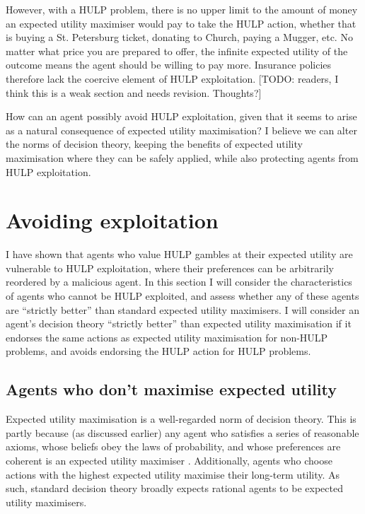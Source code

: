 \documentclass{article}
\begin{document}
However, with a HULP problem, there is no upper limit to the amount of money an expected utility maximiser would pay to take the HULP action, whether that is buying a St. Petersburg ticket, donating to Church, paying a Mugger, etc. No matter what price you are prepared to offer, the infinite expected utility of the outcome means the agent should be willing to pay more. Insurance policies therefore lack the coercive element of HULP exploitation. [TODO: readers, I think this is a weak section and needs revision. Thoughts?]

How can an agent possibly avoid HULP exploitation, given that it seems to arise as a natural consequence of expected utility maximisation? I believe we can alter the norms of decision theory, keeping the benefits of expected utility maximisation where they can be safely applied, while also protecting agents from HULP exploitation.

\newpage\section{Avoiding exploitation}

I have shown that agents who value HULP gambles at their expected utility are vulnerable to HULP exploitation, where their preferences can be arbitrarily reordered by a malicious agent. In this section I will consider the characteristics of agents who cannot be HULP exploited, and assess whether any of these agents are ``strictly better'' than standard expected utility maximisers. I will consider an agent's decision theory ``strictly better'' than expected utility maximisation if it endorses the same actions as expected utility maximisation for non-HULP problems, and avoids endorsing the HULP action for HULP problems.

\subsection{Agents who don't maximise expected utility}

Expected utility maximisation is a well-regarded norm of decision theory. This is partly because (as discussed earlier) any agent who satisfies a series of reasonable axioms, whose beliefs obey the laws of probability, and whose preferences are coherent is an expected utility maximiser \citep{von1944games}. Additionally, agents who choose actions with the highest expected utility maximise their long-term utility. As such, standard decision theory broadly expects rational agents to be expected utility maximisers.
\end{document}
